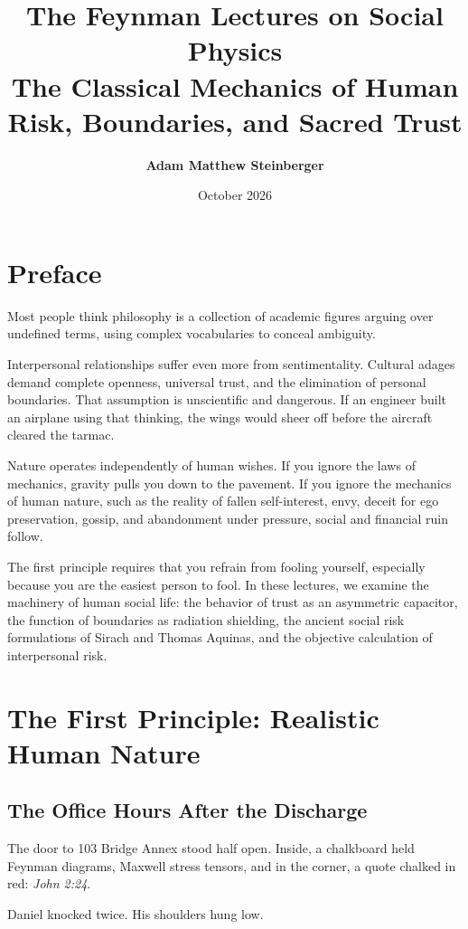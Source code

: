 \documentclass[11pt]{report}
\title{\Huge\textbf{The Feynman Lectures on Social Physics}\\
\Large The Classical Mechanics of Human Risk, Boundaries, and Sacred Trust}
\author{\textbf{Adam Matthew Steinberger}}
\date{October 2026}
\begin{document}
\maketitle

\tableofcontents
\newpage

\chapter*{Preface}

Most people think philosophy is a collection of academic figures arguing over undefined terms, using complex vocabularies to conceal ambiguity.

Interpersonal relationships suffer even more from sentimentality. Cultural adages demand complete openness, universal trust, and the elimination of personal boundaries. That assumption is unscientific and dangerous. If an engineer built an airplane using that thinking, the wings would sheer off before the aircraft cleared the tarmac.

Nature operates independently of human wishes. If you ignore the laws of mechanics, gravity pulls you down to the pavement. If you ignore the mechanics of human nature, such as the reality of fallen self-interest, envy, deceit for ego preservation, gossip, and abandonment under pressure, social and financial ruin follow.

The first principle requires that you refrain from fooling yourself, especially because you are the easiest person to fool. In these lectures, we examine the machinery of human social life: the behavior of trust as an asymmetric capacitor, the function of boundaries as radiation shielding, the ancient social risk formulations of Sirach and Thomas Aquinas, and the objective calculation of interpersonal risk.

\chapter{The First Principle: Realistic Human Nature}

\section{The Office Hours After the Discharge}
The door to 103 Bridge Annex stood half open. Inside, a chalkboard held Feynman diagrams, Maxwell stress tensors, and in the corner, a quote chalked in red: \textit{John 2:24}.

Daniel knocked twice. His shoulders hung low.
\end{document}
